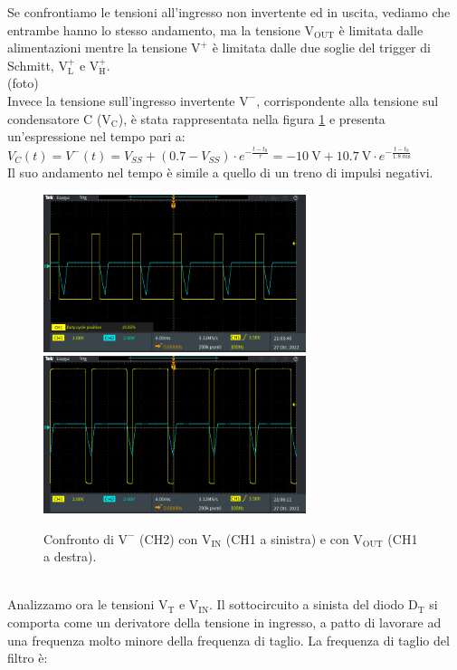 \documentclass{report}
\begin{document}
Se confrontiamo le tensioni all'ingresso non invertente ed in uscita, vediamo che entrambe hanno lo stesso andamento, ma la tensione $\mathrm{V_{OUT}}$ è limitata dalle alimentazioni mentre la tensione $\mathrm{V^+}$ è limitata dalle due soglie del trigger di Schmitt, $\mathrm{V_L^+}$ e $\mathrm{V_H^+}$.
\\(foto)
\\Invece la tensione sull'ingresso invertente $\mathrm{V^-}$, corrispondente alla tensione sul condensatore C ($\mathrm{V_C}$), è stata rappresentata nella figura \ref{figura:TEK00004e5} e presenta un'espressione nel tempo pari a:
\\[4pt]\indent$\displaystyle{V_C(t)=V^-(t)=V_{SS}+(0.7-V_{SS})\cdot e^{-\frac{t-t_0}{\tau}}=\SI{-10}{\volt}+\SI{10.7}{\volt}\cdot e^{-\frac{t-t_0}{\SI{1.8}{m\second}}}}$
\\Il suo andamento nel tempo è simile a quello di un treno di impulsi negativi.
\begin{figure}[h!]
	\centering
	\includegraphics[height=4.6cm]{immagini/TEK00004}
	\includegraphics[height=4.6cm]{immagini/TEK00005}
	\caption{Confronto di $\mathrm{V^-}$ (CH2) con $\mathrm{V_{IN}}$ (CH1 a sinistra) e con $\mathrm{V_{OUT}}$ (CH1 a destra).}
	\label{figura:TEK00004e5}
\end{figure}
\\Analizzamo ora le tensioni $\mathrm{V_T}$ e $\mathrm{V_{IN}}$. Il sottocircuito a sinista del diodo $\mathrm{D_T}$ si comporta come un derivatore della tensione in ingresso, a patto di lavorare ad una frequenza molto minore della frequenza di taglio. La frequenza di taglio del filtro è:
\end{document}
